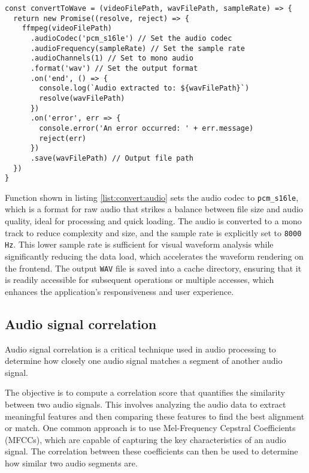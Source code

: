 \begin{clisting}
\label{list:convert:audio}
\begin{verbatim}
const convertToWave = (videoFilePath, wavFilePath, sampleRate) => {
  return new Promise((resolve, reject) => {
    ffmpeg(videoFilePath)
      .audioCodec('pcm_s16le') // Set the audio codec
      .audioFrequency(sampleRate) // Set the sample rate
      .audioChannels(1) // Set to mono audio
      .format('wav') // Set the output format
      .on('end', () => {
        console.log(`Audio extracted to: ${wavFilePath}`)
        resolve(wavFilePath)
      })
      .on('error', err => {
        console.error('An error occurred: ' + err.message)
        reject(err)
      })
      .save(wavFilePath) // Output file path
  })
}
\end{verbatim}
\end{clisting}
\noindent Function shown in listing \ref{list:convert:audio} sets the audio codec to \texttt{pcm\_s16le}, which is a format for raw audio that strikes a balance between file size and audio quality, ideal for processing and quick loading. The audio is converted to a mono track to reduce complexity and size, and the sample rate is explicitly set to \texttt{8000 Hz}. This lower sample rate is sufficient for visual waveform analysis while significantly reducing the data load, which accelerates the waveform rendering on the frontend. The output \texttt{WAV} file is saved into a cache directory, ensuring that it is readily accessible for subsequent operations or multiple accesses, which enhances the application's responsiveness and user experience.
\subsection{Audio signal correlation}
\label{implement:backend:align}

Audio signal correlation is a critical technique used in audio processing to determine how closely one audio signal matches a segment of another audio signal. 

The objective is to compute a correlation score that quantifies the similarity between two audio signals. This involves analyzing the audio data to extract meaningful features and then comparing these features to find the best alignment or match. One common approach is to use Mel-Frequency Cepstral Coefficients (MFCCs), which are capable of capturing the key characteristics of an audio signal. The correlation between these coefficients can then be used to determine how similar two audio segments are.

